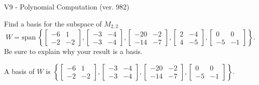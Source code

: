 \begin{exercise}
  \begin{exerciseTitle}V9 - Polynomial Computation (ver. 982)\end{exerciseTitle}
  \begin{exerciseStatement}
    Find a basis for the subspace of \(M_{2,2}\) 
\[W=\mathrm{span}\ \left\{\left[\begin{array}{cc}
-6 & 1 \\
-2 & -2
\end{array}\right] , \left[\begin{array}{cc}
-3 & -4 \\
-3 & -4
\end{array}\right] , \left[\begin{array}{cc}
-20 & -2 \\
-14 & -7
\end{array}\right] , \left[\begin{array}{cc}
2 & -4 \\
4 & -5
\end{array}\right] , \left[\begin{array}{cc}
0 & 0 \\
-5 & -1
\end{array}\right]\right\}.\]
 Be sure to explain why your result is a basis.


  \end{exerciseStatement}
  \begin{exerciseAnswer}
   A basis of \(W\) is  \(\left\{\left[\begin{array}{cc}
-6 & 1 \\
-2 & -2
\end{array}\right] , \left[\begin{array}{cc}
-3 & -4 \\
-3 & -4
\end{array}\right] , \left[\begin{array}{cc}
-20 & -2 \\
-14 & -7
\end{array}\right] , \left[\begin{array}{cc}
0 & 0 \\
-5 & -1
\end{array}\right]\right\}\).
  


  \end{exerciseAnswer}
\end{exercise}